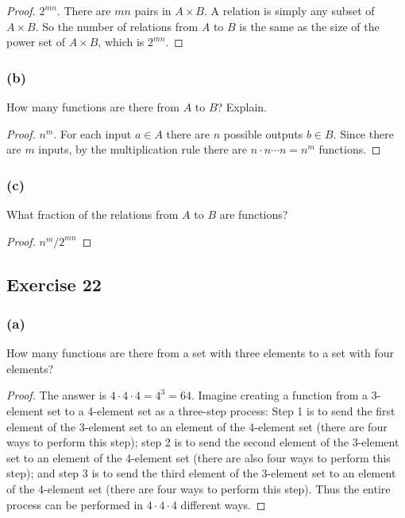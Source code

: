 \documentclass[14pt]{extarticle}
\begin{document}
\begin{proof}
\(2^{mn}\). There are $mn$ pairs in \(A \times B\). A relation is simply any subset of \(A \times B\). So the
number of relations from $A$ to $B$ is the same as the size of the power set of \(A \times B\), which is \(2^{mn}\).
\end{proof}

\subsubsection{(b)}
How many functions are there from $A$ to $B$? Explain.

\begin{proof}
\(n^m\). For each input \(a \in A\) there are $n$ possible outputs \(b \in B\). Since there are $m$ inputs, by the
multiplication rule there are \(n \cdot n \cdots n = n^m\) functions.
\end{proof}

\subsubsection{(c)}
What fraction of the relations from $A$ to $B$ are functions?

\begin{proof}
\(n^m / 2^{mn}\)
\end{proof}

\subsection{Exercise 22}
\subsubsection{(a)}
How many functions are there from a set with three elements to a set with four elements?

\begin{proof}
The answer is \(4 \cdot 4 \cdot 4 = 4^3 = 64\). Imagine creating a function from a 3-element set to a 4-element set 
as a three-step process: Step 1 is to send the first element of the 3-element set to an element of the 4-element 
set (there are four ways to perform this step); step 2 is to send the second element of the 3-element set to an 
element of the 4-element set (there are also four ways to perform this step); and step 3 is to send the third element 
of the 3-element set to an element of the 4-element set (there are four ways to perform this step). Thus the entire 
process can be performed in \(4 \cdot 4 \cdot 4\) different ways.
\end{proof}
\end{document}
